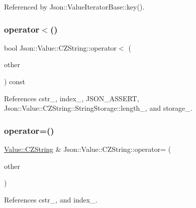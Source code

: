 Referenced by Json\+::\+Value\+Iterator\+Base\+::key().

\mbox{\label{classJson_1_1Value_1_1CZString_ae023bb91b4b4520c82d5e6e4da8c310a_ae023bb91b4b4520c82d5e6e4da8c310a}} 
\subsubsection{\texorpdfstring{operator$<$()}{operator<()}}
{\footnotesize\ttfamily bool Json\+::\+Value\+::\+C\+Z\+String\+::operator$<$ (\begin{DoxyParamCaption}\item[{\hyperlink{classJson_1_1Value_1_1CZString}{C\+Z\+String} const \&}]{other }\end{DoxyParamCaption}) const}



References cstr\+\_\+, index\+\_\+, J\+S\+O\+N\+\_\+\+A\+S\+S\+E\+RT, Json\+::\+Value\+::\+C\+Z\+String\+::\+String\+Storage\+::length\+\_\+, and storage\+\_\+.

\mbox{\label{classJson_1_1Value_1_1CZString_aba1b28d22cdd1eaad1c17f8844af9d4a_aba1b28d22cdd1eaad1c17f8844af9d4a}} 
\subsubsection{\texorpdfstring{operator=()}{operator=()}}
{\footnotesize\ttfamily \hyperlink{classJson_1_1Value_1_1CZString}{Value\+::\+C\+Z\+String} \& Json\+::\+Value\+::\+C\+Z\+String\+::operator= (\begin{DoxyParamCaption}\item[{const \hyperlink{classJson_1_1Value_1_1CZString}{C\+Z\+String} \&}]{other }\end{DoxyParamCaption})}



References cstr\+\_\+, and index\+\_\+.

\mbox{\label{classJson_1_1Value_1_1CZString_ad41766c98fc6a6d5fcd72aaf78fc5db0_ad41766c98fc6a6d5fcd72aaf78fc5db0}} 
